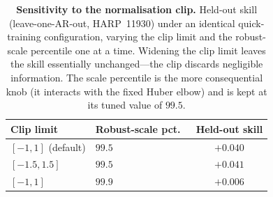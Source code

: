 \begin{table}[!htbp]
\centering
\small
\caption[Clip sensitivity]{\textbf{Sensitivity to the normalisation clip.}
Held-out skill (leave-one-AR-out, HARP~11930) under an identical quick-training
configuration, varying the clip limit and the robust-scale percentile one at a
time. Widening the clip limit leaves the skill essentially unchanged---the clip
discards negligible information. The scale percentile is the more consequential
knob (it interacts with the fixed Huber elbow) and is kept at its tuned value of
$99.5$.}
\label{tab:clip}
\renewcommand{\arraystretch}{1.2}
\begin{tabular}{|l|l|c|}
\hline
Clip limit & Robust-scale pct.\ & Held-out skill \\
\hline\hline
$[-1,1]$ (default) & $99.5$ & $+0.040$ \\ \hline
$[-1.5,1.5]$       & $99.5$ & $+0.041$ \\ \hline
$[-1,1]$           & $99.9$ & $+0.006$ \\ \hline
\end{tabular}
\end{table}
